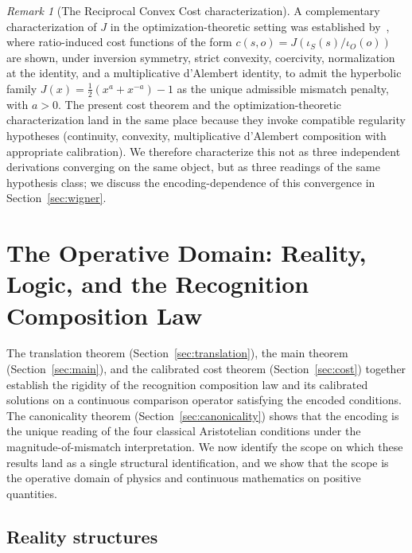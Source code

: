 \documentclass[11pt,a4paper]{article}
\theoremstyle{definition}
\theoremstyle{remark}
\newtheorem{remark}[theorem]{Remark}
\begin{document}
\begin{remark}[The Reciprocal Convex Cost characterization]
A complementary characterization of $J$ in the optimization-theoretic
setting was established by~\cite{WashburnRahnamai2026}, where ratio-induced
cost functions of the form $c(s, o) = J(\iota_S(s)/\iota_O(o))$ are shown,
under inversion symmetry, strict convexity, coercivity, normalization at
the identity, and a multiplicative d'Alembert identity, to admit the
hyperbolic family $J(x) = \tfrac{1}{2}(x^a + x^{-a}) - 1$ as the unique
admissible mismatch penalty, with $a > 0$. The present cost theorem and
the optimization-theoretic characterization land in the same place
because they invoke compatible regularity hypotheses (continuity, convexity,
multiplicative d'Alembert composition with appropriate calibration). We
therefore characterize this not as three independent derivations
converging on the same object, but as three readings of the same
hypothesis class; we discuss the encoding-dependence of this convergence
in Section~\ref{sec:wigner}.
\end{remark}

\section{The Operative Domain: Reality, Logic, and the Recognition Composition Law}\label{sec:operative}

The translation theorem (Section~\ref{sec:translation}), the main
theorem (Section~\ref{sec:main}), and the calibrated cost theorem
(Section~\ref{sec:cost}) together establish the rigidity of the
recognition composition law and its calibrated solutions on a
continuous comparison operator satisfying the encoded conditions. The
canonicality theorem (Section~\ref{sec:canonicality}) shows that the
encoding is the unique reading of the four classical Aristotelian
conditions under the magnitude-of-mismatch interpretation. We now
identify the scope on which these results land as a single structural
identification, and we show that the scope is the operative domain of
physics and continuous mathematics on positive quantities.

\subsection{Reality structures}
\end{document}
